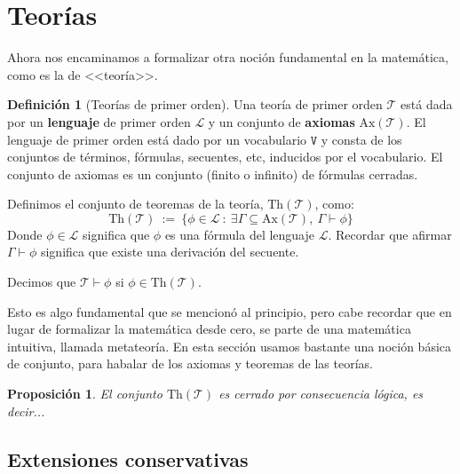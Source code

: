 \documentclass[a4paper, 12pt]{report}
\newcommand{\te}{\text}
\newtheorem{prop}[teorema]{Proposición}
\theoremstyle{definition}
\newtheorem{definicion}[teorema]{Definición}
\begin{document}
\section{Teorías}

Ahora nos encaminamos a formalizar otra noción fundamental en la matemática, como es la de <<teoría>>.
\begin{definicion}[Teorías de primer orden]
	Una teoría de primer orden $\mathcal{T}$ está dada por un \textbf{lenguaje} de primer orden $\mathcal{L}$ y un conjunto de \textbf{axiomas} $\te{Ax}(\mathcal{T})$. El lenguaje de primer orden está dado por un vocabulario $\mathtt{V}$ y consta de los conjuntos de términos, fórmulas, secuentes, etc, inducidos por el vocabulario. El conjunto de axiomas es un conjunto (finito o infinito) de fórmulas cerradas.
	
	Definimos el conjunto de teoremas de la teoría, $\te{Th}(\mathcal{T})$, como:
	$$ \te{Th}(\mathcal{T})~:=~\{\phi\in\mathcal{L}~:~\exists\Gamma\subseteq \te{Ax}(\mathcal{T}),~\Gamma\vdash\phi\}
	$$
	Donde $\phi\in\mathcal{L}$ significa que $\phi$ es una fórmula del lenguaje $\mathcal{L}$. Recordar que afirmar $\Gamma\vdash\phi$ significa que existe una derivación del secuente.
	
	Decimos que $\mathcal{T}\vdash\phi$ si $\phi\in \te{Th}(\mathcal{T})$.
\end{definicion}
Esto es algo fundamental que se mencionó al principio, pero cabe recordar que en lugar de formalizar la matemática desde cero, se parte de una matemática intuitiva, llamada metateoría. En esta sección usamos bastante una noción básica de conjunto, para habalar de los axiomas y teoremas de las teorías.

\begin{prop}
	El conjunto $\te{Th}(\mathcal{T})$ es cerrado por consecuencia lógica, es decir...
\end{prop}


\subsection{Extensiones conservativas}
\end{document}
